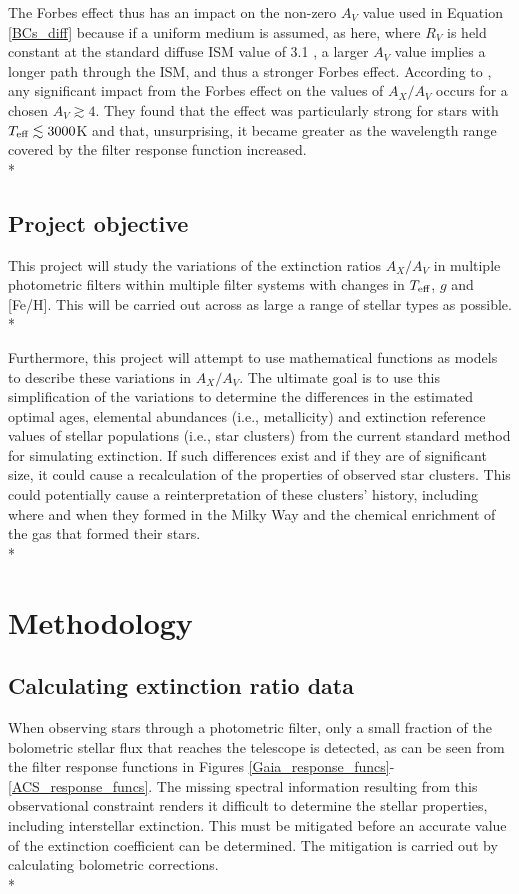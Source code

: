 \documentclass[12pt, a4paper]{report}
\begin{document}
The Forbes effect thus has an impact on the non-zero $A_{V}$ value used in Equation \ref{BCs_diff} because if a uniform medium is assumed, as here, where $R_{V}$ is held constant at the standard diffuse ISM value of 3.1 \citep{1989ApJ...345..245C}, a larger $A_{V}$ value implies a longer path through the ISM, and thus a stronger Forbes effect. According to \cite{2008PASP..120..583G}, any significant impact from the Forbes effect on the values of $A_{X}/A_{V}$ occurs for a chosen $A_{V} \gtrsim 4$. They found that the effect was particularly strong for stars with $T_{\textnormal{eff}} \lesssim 3000$K and that, unsurprising, it became greater as the wavelength range covered by the filter response function increased.\\*

\section{Project objective}
This project will study the variations of the extinction ratios $A_{X}/A_{V}$ in multiple photometric filters within multiple filter systems with changes in $T_{\textnormal{eff}}$, $g$ and [Fe/H]. This will be carried out across as large a range of stellar types as possible.\\*

Furthermore, this project will attempt to use mathematical functions as models to describe these variations in $A_{X}/A_{V}$. The ultimate goal is to use this simplification of the variations to determine the differences in the estimated optimal ages, elemental abundances (i.e., metallicity) and extinction reference values of stellar populations (i.e., star clusters) from the current standard method for simulating extinction. If such differences exist and if they are of significant size, it could cause a recalculation of the properties of observed star clusters. This could potentially cause a reinterpretation of these clusters' history, including where and when they formed in the Milky Way and the chemical enrichment of the gas that formed their stars. \\*



\chapter{Methodology}
\section{Calculating extinction ratio data}
When observing stars through a photometric filter, only a small fraction of the bolometric stellar flux that reaches the telescope is detected, as can be seen from the filter response functions in Figures \ref{Gaia_response_funcs}-\ref{ACS_response_funcs}. The missing spectral information resulting from this observational constraint renders it difficult to determine the stellar properties, including interstellar extinction. This must be mitigated before an accurate value of the extinction coefficient can be determined. The mitigation is carried out by calculating bolometric corrections.\\*
\end{document}
